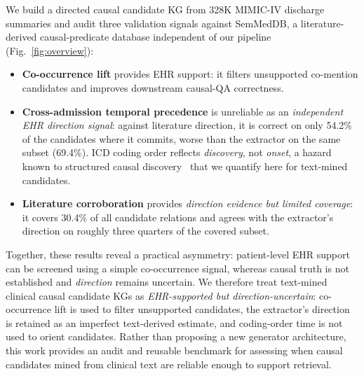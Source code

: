 \documentclass[runningheads]{llncs}
\begin{document}
We build a directed causal candidate KG from 328K MIMIC-IV discharge summaries and audit three validation signals against SemMedDB, a literature-derived causal-predicate database independent of our pipeline (Fig.~\ref{fig:overview}):
\begin{itemize}
\item \textbf{Co-occurrence lift} provides EHR support: it filters unsupported co-mention candidates and improves downstream causal-QA correctness.
\item \textbf{Cross-admission temporal precedence} is unreliable as an \emph{independent EHR direction signal}: against literature direction, it is correct on only 54.2\% of the candidates where it commits, worse than the extractor on the same subset (69.4\%). ICD coding order reflects \emph{discovery}, not \emph{onset}, a hazard known to structured causal discovery~\cite{shen2021causaldiscovery} that we quantify here for text-mined candidates.
\item \textbf{Literature corroboration} provides \emph{direction evidence but limited coverage}: it covers 30.4\% of all candidate relations and agrees with the extractor's direction on roughly three quarters of the covered subset.
\end{itemize}

Together, these results reveal a practical asymmetry: patient-level EHR support can be screened using a simple co-occurrence signal, whereas causal truth is not established and \emph{direction} remains uncertain. We therefore treat text-mined clinical causal candidate KGs as \emph{EHR-supported but direction-uncertain}: co-occurrence lift is used to filter unsupported candidates, the extractor's direction is retained as an imperfect text-derived estimate, and coding-order time is not used to orient candidates. Rather than proposing a new generator architecture, this work provides an audit and reusable benchmark for assessing when causal candidates mined from clinical text are reliable enough to support retrieval.
\end{document}
